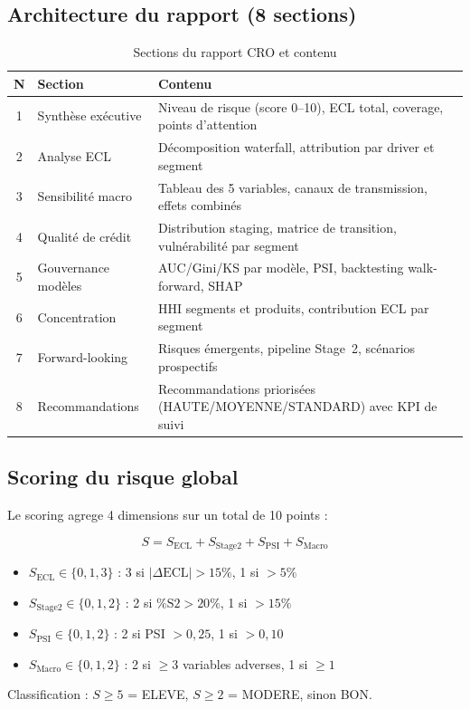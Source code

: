 \documentclass[12pt,a4paper]{article}
\begin{document}
\subsection{Architecture du rapport (8 sections)}

\begin{table}[htbp]
\centering
\caption{Sections du rapport CRO et contenu}
\begin{tabular}{clp{8cm}}
\toprule
\textbf{N} & \textbf{Section} & \textbf{Contenu} \\
\midrule
1 & Synth\`ese ex\'ecutive & Niveau de risque (score 0--10), ECL total,
    coverage, points d'attention \\
2 & Analyse ECL & D\'ecomposition waterfall, attribution par driver
    et segment \\
3 & Sensibilit\'e macro & Tableau des 5 variables, canaux de transmission,
    effets combin\'es \\
4 & Qualit\'e de cr\'edit & Distribution staging, matrice de transition,
    vuln\'erabilit\'e par segment \\
5 & Gouvernance mod\`eles & AUC/Gini/KS par mod\`ele, PSI, backtesting
    walk-forward, SHAP \\
6 & Concentration & HHI segments et produits, contribution ECL par
    segment \\
7 & Forward-looking & Risques \'emergents, pipeline Stage~2,
    sc\'enarios prospectifs \\
8 & Recommandations & Recommandations prioris\'ees (HAUTE/MOYENNE/STANDARD)
    avec KPI de suivi \\
\bottomrule
\end{tabular}
\label{tab:report_sections}
\end{table}

\subsection{Scoring du risque global}

Le scoring agrege 4 dimensions sur un total de 10 points :

\begin{formulebox}
\begin{equation}
    S = S_{\text{ECL}} + S_{\text{Stage2}} + S_{\text{PSI}} + S_{\text{Macro}}
    \label{eq:risk_score}
\end{equation}
\begin{itemize}[nosep]
    \item $S_{\text{ECL}} \in \{0, 1, 3\}$ : 3 si $|\Delta\text{ECL}| > 15\%$, 1 si $> 5\%$
    \item $S_{\text{Stage2}} \in \{0, 1, 2\}$ : 2 si $\%\text{S2} > 20\%$, 1 si $> 15\%$
    \item $S_{\text{PSI}} \in \{0, 1, 2\}$ : 2 si PSI $> 0{,}25$, 1 si $> 0{,}10$
    \item $S_{\text{Macro}} \in \{0, 1, 2\}$ : 2 si $\geq 3$ variables adverses, 1 si $\geq 1$
\end{itemize}
Classification : $S \geq 5$ = \textcolor{accentred}{ELEVE}, $S \geq 2$ = \textcolor{accentorange}{MODERE}, sinon \textcolor{accentgreen}{BON}.
\end{formulebox}
\end{document}
